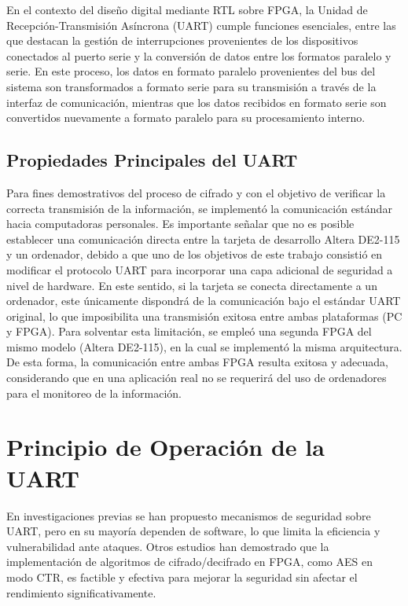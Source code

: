 En el contexto del diseño digital mediante RTL sobre FPGA, la Unidad de Recepción-Transmisión Asíncrona (UART) cumple funciones esenciales, entre las que destacan la gestión de interrupciones provenientes de los dispositivos conectados al puerto serie y la conversión de datos entre los formatos paralelo y serie. En este proceso, los datos en formato paralelo provenientes del bus del sistema son transformados a formato serie para su transmisión a través de la interfaz de comunicación, mientras que los datos recibidos en formato serie son convertidos nuevamente a formato paralelo para su procesamiento interno.

\subsection{Propiedades Principales del UART}

Para fines demostrativos del proceso de cifrado y con el objetivo de verificar la correcta transmisión de la información, se implementó la comunicación estándar hacia computadoras personales. Es importante señalar que no es posible establecer una comunicación directa entre la tarjeta de desarrollo Altera DE2-115 y un ordenador, debido a que uno de los objetivos de este trabajo consistió en modificar el protocolo UART para incorporar una capa adicional de seguridad a nivel de hardware. En este sentido, si la tarjeta se conecta directamente a un ordenador, este únicamente dispondrá de la comunicación bajo el estándar UART original, lo que imposibilita una transmisión exitosa entre ambas plataformas (PC y FPGA). Para solventar esta limitación, se empleó una segunda FPGA del mismo modelo (Altera DE2-115), en la cual se implementó la misma arquitectura. De esta forma, la comunicación entre ambas FPGA resulta exitosa y adecuada, considerando que en una aplicación real no se requerirá del uso de ordenadores para el monitoreo de la información.


\section{Principio de Operación de la UART}
En investigaciones previas se han propuesto mecanismos de seguridad sobre UART, pero en su mayoría dependen de software, lo que limita la eficiencia y vulnerabilidad ante ataques. Otros estudios han demostrado que la implementación de algoritmos de cifrado/decifrado en FPGA, como AES en modo CTR, es factible y efectiva para mejorar la seguridad sin afectar el rendimiento significativamente.

